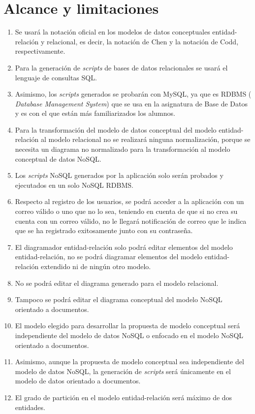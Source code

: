 \section{Alcance y limitaciones}

\begin{enumerate}
    \item Se usará la notación oficial en los modelos de datos conceptuales entidad-relación y relacional, es decir, la notación de Chen y la notación de Codd, respectivamente.
    \item Para la generación de \textit{scripts} de bases de datos relacionales se usará el lenguaje de consultas SQL.
    \item Asimismo, los \textit{scripts} generados se probarán con MySQL, ya que es RDBMS (\textit{ Database Management System}) que se usa en la asignatura de Base de Datos y es con el que están más familiarizados los alumnos.
    \item Para la transformación del modelo de datos conceptual del modelo entidad-relación al modelo relacional no se realizará ninguna normalización, porque se necesita un diagrama no normalizado para la transformación al modelo conceptual de datos NoSQL.
    \item Los \textit{scripts} NoSQL generados por la aplicación solo serán probados y ejecutados en un solo NoSQL RDBMS.
    \item Respecto al registro de los usuarios, se podrá acceder a la aplicación con un correo válido o uno que no lo sea, teniendo en cuenta de que si no crea su cuenta con un correo válido, no le llegará notificación de correo que le indica que se ha registrado exitosamente junto con su contraseña.
    \item El diagramador entidad-relación solo podrá editar elementos del modelo entidad-relación, no se podrá diagramar elementos del modelo entidad-relación extendido ni de ningún otro modelo.
    \item No se podrá editar el diagrama generado para el modelo relacional.
    \item Tampoco se podrá editar el diagrama conceptual del modelo NoSQL orientado a documentos.
    \item El modelo elegido para desarrollar la propuesta de modelo conceptual será independiente del modelo de datos NoSQL o enfocado en el modelo NoSQL orientado a documentos.
    \item Asimismo, aunque la propuesta de modelo conceptual sea independiente del modelo de datos NoSQL, la generación de \textit{scripts} será únicamente en el modelo de datos orientado a documentos.
    \item El grado de partición en el modelo entidad-relación será máximo de dos entidades.
    
    
\end{enumerate}
